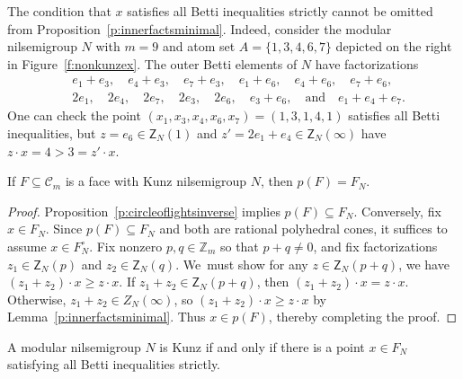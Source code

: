 \documentclass[ALCO, Unicode]{cedram}
\newcommand\ZZ{\mathbb{Z}}
\newcommand\cC{{\mathcal C}}
\begin{document}
\begin{exam}\label{e:innerfactsminimal}
The condition that $x$ satisfies all Betti inequalities strictly cannot be omitted from Proposition~\ref{p:innerfactsminimal}.  Indeed, consider the modular nilsemigroup $N$ with $m = 9$ and atom set $A = \{1,3,4,6,7\}$ depicted on the right in Figure~\ref{f:nonkunzex}.  The outer Betti elements of $N$ have factorizations
\begin{align*}
&
e_1 + e_3,
\quad
e_4 + e_3,
\quad
e_7 + e_3,
\quad
e_1 + e_6,
\quad
e_4 + e_6,
\quad
e_7 + e_6,
\\
&
2e_1,
\quad
2e_4,
\quad
2e_7,
\quad
2e_3,
\quad
2e_6, 
\quad
e_3 + e_6, 
\quad \text{and} \quad
e_1 + e_4 + e_7.
\end{align*}
One can check the point $(x_1, x_3, x_4, x_6, x_7) = (1,3,1,4,1)$ satisfies all Betti inequalities, but $z = e_6 \in \mathsf Z_N(1)$ and $z' = 2e_1 + e_4 \in \mathsf Z_N(\infty)$ have $z \cdot x = 4 > 3 = z' \cdot x$.  
\end{exam}

\begin{thm}\label{t:outerbettihdesc}
If $F \subseteq \cC_m$ is a face with Kunz nilsemigroup $N$, then $p(F) = F_N$.
\end{thm}

\begin{proof}
Proposition~\ref{p:circleoflightsinverse} implies $p(F) \subseteq F_N$.  Conversely, fix $x \in F_N$.  Since $p(F) \subseteq F_N$ and both are rational polyhedral cones, it suffices to assume $x \in F_N^\circ$.  Fix nonzero $p, q \in \ZZ_m$ so that $p + q \ne 0$, and fix factorizations $z_1 \in \mathsf{Z}_N(p)$ and $z_2 \in \mathsf{Z}_N(q)$. We~must show for any $z \in \mathsf{Z}_N(p + q)$, we have $(z_1+z_2)\cdot x \geq z \cdot x$. If $z_1 + z_2 \in \mathsf{Z}_N(p + q)$, then $(z_1 + z_2) \cdot x = z \cdot x$.  Otherwise, $z_1 + z_2 \in Z_N(\infty)$, so $(z_1 + z_2)\cdot x \geq z \cdot x$ by Lemma~\ref{p:innerfactsminimal}.  Thus $x \in p(F)$, thereby completing the proof.
\end{proof}

\begin{thm} \label{t:kunzcondition}
A modular nilsemigroup $N$ is Kunz if and only if there is a point $x \in F_N$ satisfying all Betti inequalities strictly.  
\end{thm}
\end{document}
